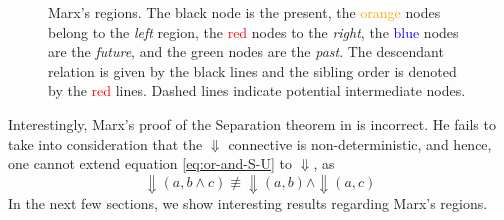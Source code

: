 \documentclass[a4paper,UKenglish,cleveref, autoref, thm-restate]{lipics-v2021}
\begin{document}
\begin{figure}
    \centering
    \caption[]{Marx's regions. The black node is the present, the \textcolor{orange}{orange} nodes belong to the \textit{left} region, the \textcolor{red}{red} nodes to the \textit{right}, the \textcolor{blue}{blue} nodes are the \textit{future}, and the \textcolor{OliveGreen}{green} nodes are the \textit{past}. The descendant relation is given by the black lines and the sibling order is denoted by the \textcolor{red}{red} lines. Dashed lines indicate potential intermediate nodes.}
    \label{fig:marx-regions}
\end{figure}

Interestingly, Marx's proof of the Separation theorem in \cite{xpathComplete} is incorrect. He fails to take into consideration that the $\Downarrow$ connective is non-deterministic, and hence, one cannot extend equation \eqref{eq:or-and-S-U} to $\Downarrow$, as
\begin{equation*}
    \Downarrow(a, b \land c) \not\equiv \Downarrow(a, b) \land \Downarrow(a, c)
\end{equation*}
In the next few sections, we show interesting results regarding Marx's regions.





\end{document}
